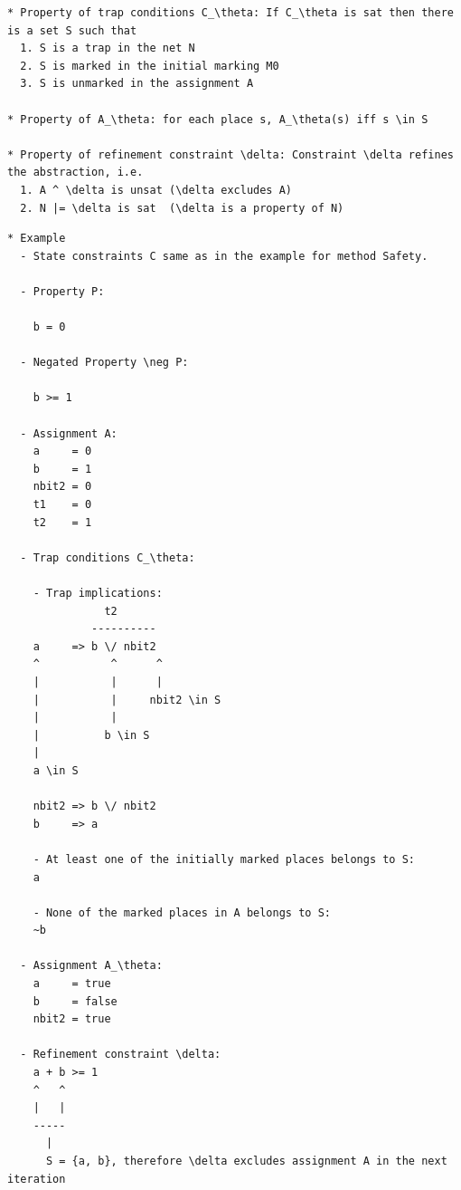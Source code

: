 \documentclass{llncs}
\begin{document}
\begin{verbatim}
* Property of trap conditions C_\theta: If C_\theta is sat then there is a set S such that
  1. S is a trap in the net N
  2. S is marked in the initial marking M0
  3. S is unmarked in the assignment A

* Property of A_\theta: for each place s, A_\theta(s) iff s \in S

* Property of refinement constraint \delta: Constraint \delta refines the abstraction, i.e.
  1. A ^ \delta is unsat (\delta excludes A)
  2. N |= \delta is sat  (\delta is a property of N)
\end{verbatim}

\newpage
\begin{verbatim}
* Example
  - State constraints C same as in the example for method Safety.
 
  - Property P:

    b = 0 
  
  - Negated Property \neg P:
    
    b >= 1

  - Assignment A:
    a     = 0
    b     = 1
    nbit2 = 0
    t1    = 0
    t2    = 1

  - Trap conditions C_\theta:

    - Trap implications:
               t2
             ----------
    a     => b \/ nbit2
    ^           ^      ^
    |           |      |
    |           |     nbit2 \in S
    |           |
    |          b \in S
    |
    a \in S
    
    nbit2 => b \/ nbit2
    b     => a

    - At least one of the initially marked places belongs to S:
    a

    - None of the marked places in A belongs to S:
    ~b
  
  - Assignment A_\theta:
    a     = true
    b     = false
    nbit2 = true

  - Refinement constraint \delta:
    a + b >= 1
    ^   ^
    |   |
    -----
      |
      S = {a, b}, therefore \delta excludes assignment A in the next iteration
\end{verbatim}

\newpage
\end{document}

